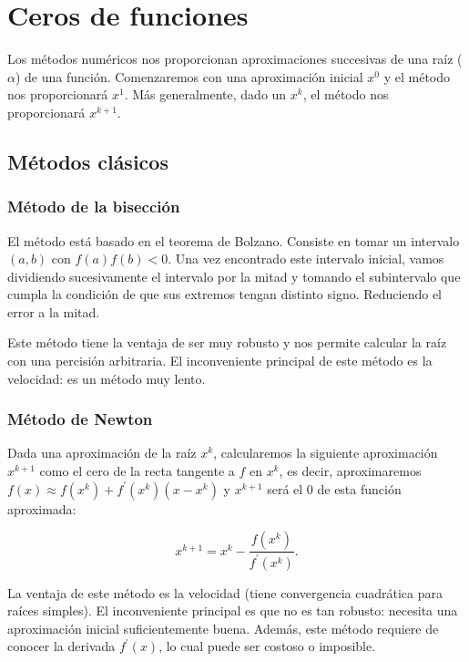 \chapter{Ceros de funciones}

Los métodos numéricos nos proporcionan aproximaciones succesivas de una raíz ($\alpha$) de una función.
Comenzaremos con una aproximación inicial $x^0$  y el método nos proporcionará $x^1$. Más
generalmente, dado un $x^k$, el método nos proporcionará $x^{k+1}$.

\section{Métodos clásicos}

\subsection{Método de la bisección}

El método está basado en el teorema de Bolzano. Consiste en tomar un intervalo $(a, b)$
con $f(a)f(b) < 0$. Una vez encontrado este intervalo inicial, vamos dividiendo sucesivamente
el intervalo por la mitad y tomando el subintervalo que cumpla la condición de que sus extremos tengan
distinto signo. Reduciendo el error a la mitad.

Este método tiene la ventaja de ser muy robusto y nos permite calcular la raíz con una percisión arbitraria.
El inconveniente principal de este método es la velocidad: es un método muy lento.

\subsection{Método de Newton}

Dada una aproximación de la raíz $x^k$, calcularemos la siguiente aproximación $x^{k+1}$ como el cero de 
la recta tangente a $f$ en $x^k$, es decir, aproximaremos $f(x) \approx
f\left( x^k \right) + f^\prime\left( x^k \right) \left( x - x^k \right)$ y $x^{k+1}$ será el 0 de esta función aproximada:

\[
    x^{k+1} = x^k - \frac{f\left( x^k \right)}{f^\prime\left( x^k \right)}.
\]

La ventaja de este método es la velocidad (tiene convergencia cuadrática para raíces simples).
El inconveniente principal es que no es tan robusto: necesita una aproximación inicial suficientemente buena.
Además, este método requiere de conocer la derivada $f^\prime(x)$, lo cual puede ser costoso o imposible.

